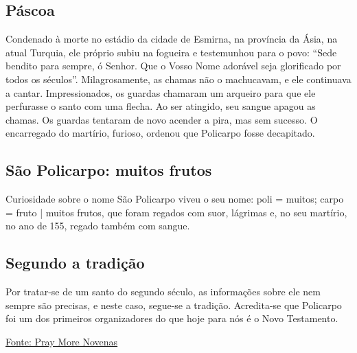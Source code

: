 \documentclass[a4paper,14pt]{extarticle} \usepackage[utf8]{inputenc}
\begin{document}
\begin{justify}
\vspace{.8cm}
\begin{justify}
 \subsection{Páscoa}
\end{justify}

Condenado à morte no estádio da cidade de Esmirna, na província da Ásia, na atual Turquia, ele próprio subiu na fogueira e testemunhou para o povo: “Sede bendito para sempre, ó Senhor. Que o Vosso Nome adorável seja glorificado por todos os séculos”. Milagrosamente, as chamas não o machucavam, e ele continuava a cantar. Impressionados, os guardas chamaram um arqueiro para que ele perfurasse o santo com uma flecha. Ao ser atingido, seu sangue apagou as chamas. Os guardas tentaram de novo acender a pira, mas sem sucesso. O encarregado do martírio, furioso, ordenou que Policarpo fosse decapitado.

\begin{justify}
 \subsection{São Policarpo: muitos frutos}
\end{justify}

Curiosidade sobre o nome
São Policarpo viveu o seu nome: poli = muitos; carpo = fruto | muitos frutos, que foram regados com suor, lágrimas e, no seu martírio, no ano de 155, regado também com sangue.

\begin{justify}
 \subsection{Segundo a tradição}
\end{justify}

Por tratar-se de um santo do segundo século, as informações sobre ele nem sempre são precisas, e neste caso, segue-se a tradição. Acredita-se que Policarpo foi um dos primeiros organizadores do que hoje para nós é o Novo Testamento.


\vfill

\begin{center}
 \href{https://www.praymorenovenas.com/st-margaret-of-cortona-novena}{Fonte: Pray More Novenas}
\end{center}



\end{justify}
\end{document}
